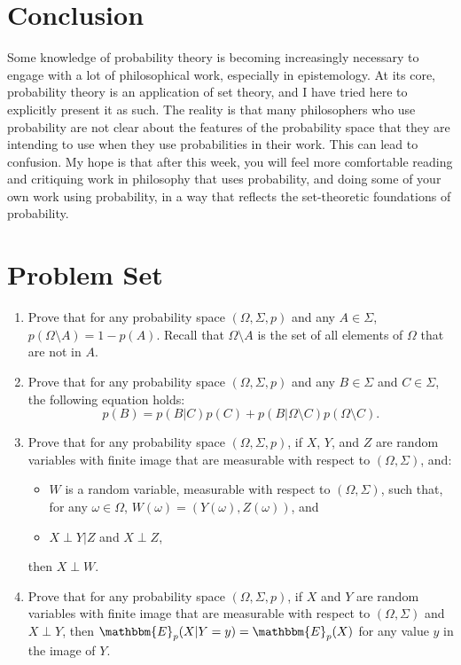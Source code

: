 \documentclass[11pt]{article}
\theoremstyle{definition}
\theoremstyle{remark}
\begin{document}
\section{Conclusion}
Some knowledge of probability theory is becoming increasingly necessary to engage with a lot of philosophical work, especially in epistemology. At its core, probability theory is an application of set theory, and I have tried here to explicitly present it as such. The reality is that many philosophers who use probability are not clear about the features of the probability space that they are intending to use when they use probabilities in their work. This can lead to confusion. My hope is that after this week, you will feel more comfortable reading and critiquing work in philosophy that uses probability, and doing some of your own work using probability, in a way that reflects the set-theoretic foundations of probability.\par 

 
\section*{Problem Set}

\begin{enumerate}
\item Prove that for any probability space $(\Omega,\Sigma,p)$ and any $A\in\Sigma$, $p(\Omega\setminus A)=1-p(A)$. Recall that $\Omega\setminus A$ is the set of all elements of $\Omega$ that are not in $A$.

\item Prove that for any probability space $(\Omega,\Sigma,p)$ and any $B\in\Sigma$ and $C\in\Sigma$, the following equation holds:
$$p(B) = p(B|C)p(C) + p(B|\Omega\setminus C)p(\Omega\setminus C).$$

\item Prove that for any probability space $(\Omega,\Sigma,p)$, if $X$, $Y$, and $Z$ are random variables with finite image that are measurable with respect to $(\Omega,\Sigma)$, and: 
\begin{itemize}
    \item $W$ is a random variable, measurable with respect to $(\Omega,\Sigma)$, such that, for any $\omega\in\Omega$, $W(\omega)=(Y(\omega),Z(\omega))$, and 

    \item $X\perp Y|Z$ and $X\perp Z$,
\end{itemize}
then $X\perp W$.

\item Prove that for any probability space $(\Omega,\Sigma,p)$, if $X$ and $Y$ are random variables with finite image that are measurable with respect to $(\Omega,\Sigma)$ and $X\perp Y$, then $\mathbbm{E}_{p}(X|Y=y)=\mathbbm{E}_{p}(X)$ for any value $y$ in the image of $Y$.

\end{enumerate}
\end{document}
